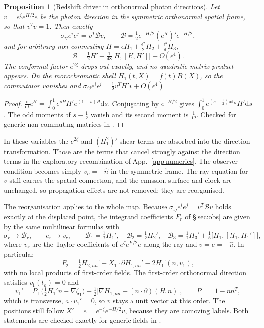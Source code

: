 \documentclass[11pt]{article}
\newtheorem{proposition}[theorem]{Proposition}
\theoremstyle{definition}
\theoremstyle{remark}
\newcommand{\eps}{\epsilon}
\newcommand{\nh}{\hat n}
\newcommand{\dd}{\mathrm{d}}
\begin{document}
\begin{proposition}[Redshift driver in orthonormal photon directions]\label{prop:orthonormal}
Let $v=e^{\zeta}e^{H/2}e$ be the photon direction in the symmetric orthonormal spatial frame,
so that $v^Tv=1$. Then exactly
\[
\sigma_{ij}e^ie^j=v^T\mathcal Bv,\qquad \mathcal B=\tfrac12e^{-H/2}(e^H)'e^{-H/2},
\]
and for arbitrary non-commuting $H=\eps H_1+\frac{\eps^2}2H_2+\frac{\eps^3}6H_3$,
\[
\boxed{\mathcal B=\tfrac12H'+\tfrac1{48}\big[H,[H,H']\big]+O(\eps^4).}
\]
The conformal factor $e^{2\zeta}$ drops out exactly, and no quadratic matrix product
appears. On the monochromatic shell $H_1(t,X)=f(t)B(X)$, so the commutator vanishes and
$\sigma_{ij}e^ie^j=\frac12v^TH'v+O(\eps^4)$.
\end{proposition}
\begin{proof}
$\frac{\dd}{\dd t}e^H=\int_0^1e^{sH}H'e^{(1-s)H}\dd s$. Conjugating by $e^{-H/2}$ gives
$\int_0^1e^{(s-\frac12)\mathrm{ad}_H}H'\dd s$. The odd moments of $s-\frac12$ vanish and its second
moment is $\frac1{12}$. Checked for generic non-commuting matrices in
.
\end{proof}
In these variables the $e^{2\zeta}$ and $(H_1^2)'$ shear terms are absorbed into the direction
transformation. Those are the terms that cancel strongly against the direction terms in the
exploratory recombination of App.~\ref{app:numerics}. The observer condition becomes simply
$v_o=-\nh$ in the symmetric frame. The ray equation for $v$ still carries the spatial
connection, and the emission surface and clock are unchanged, so propagation effects are not
removed; they are reorganised.

The reorganisation applies to the whole map. Because $\sigma_{ij}e^ie^j=v^T\mathcal B v$
holds exactly at the displaced point, the integrand coefficients $F_r$ of
\S\ref{sec:obs} are given by the same multilinear formulas with
\[
\sigma_r\to\mathcal B_r,\qquad e_r\to v_r,\qquad
\mathcal B_1=\tfrac12H_1',\quad\mathcal B_2=\tfrac12H_2',\quad
\mathcal B_3=\tfrac12H_3'+\tfrac18\big[H_1,[H_1,H_1']\big],
\]
where $v_r$ are the Taylor coefficients of $e^{\zeta}e^{H/2}e$ along the ray and $\bar v=\bar e=-\nh$.
In particular
\[
\boxed{F_2=\tfrac12H_{2,nn}'+X_1\!\cdot\!\partial H_{1,nn}'-2H_1'(n,v_1),}
\]
with no local products of first-order fields. The first-order orthonormal direction
satisfies $v_1(t_o)=0$ and
\[
v_1'=P_\perp\big(\tfrac12H_1'n+\nabla\zeta_1\big)+\tfrac12\big[\nabla H_{1,nn}-(n\cdot\partial)(H_1n)\big],
\qquad P_\perp=1-nn^T,
\]
which is transverse, $n\cdot v_1'=0$, so $v$ stays a unit vector at this order. The positions
still follow $X'=e=e^{-\zeta}e^{-H/2}v$, because they are comoving labels. Both statements are
checked exactly for generic fields in .
\end{document}

